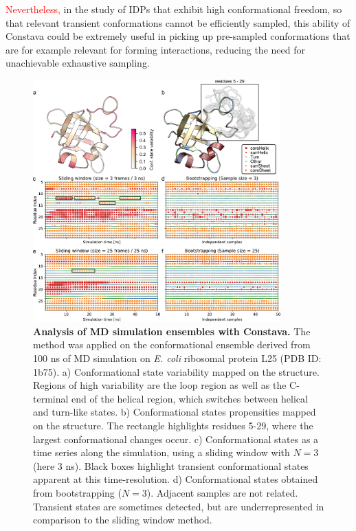 \textcolor{red}{Nevertheless,} in the study of IDPs that exhibit high conformational freedom, so that relevant transient conformations cannot be efficiently sampled, this ability of Constava could be extremely useful in picking up pre-sampled conformations that are for example relevant for forming interactions, reducing the need for unachievable exhaustive sampling. 


\begin{figure}[H]
    \centering
    \includegraphics[width=0.85\textwidth]{constava/figures_constava/figure3.pdf}
    \caption{
        \textbf{Analysis of MD simulation ensembles with Constava.} The method was applied on the conformational ensemble derived from 100 ns of MD simulation on \textit{E. coli} ribosomal protein L25 (PDB ID: 1b75).
        a) Conformational state variability mapped on the structure. Regions of high variability are the loop region as well as the C-terminal end of the helical region, which switches between helical and turn-like states.
        b) Conformational states propensities mapped on the structure. The rectangle highlights residues 5-29, where the largest conformational changes occur.
        c) Conformational states as a time series along the simulation, using a sliding window with $N = 3$ (here 3 ns). Black boxes highlight transient conformational states apparent at this time-resolution.
        d) Conformational states obtained from bootstrapping ($N = 3$). Adjacent samples are not related. Transient states are sometimes detected, but are underrepresented in comparison to the sliding window method.
}
\end{figure}
